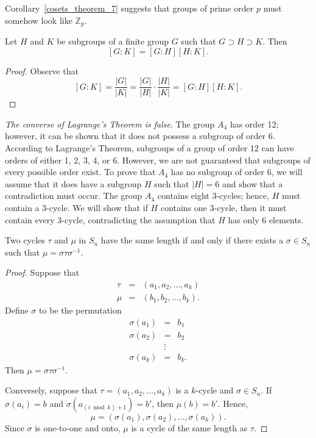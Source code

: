 \medskip

Corollary~\ref{cosets_theorem_7} suggests that groups of prime order $p$ must somehow look like ${\mathbb Z}_p$. 

\begin{corollary}\label{cosets_theorem_8}
Let $H$ and $K$ be subgroups of a finite group $G$ such that $G \supset H \supset K$.  Then 
$$
[G:K] = [G:H][H:K].
$$
\end{corollary}
 
\begin{proof}
Observe that
$$
[G:K] = \frac{|G|}{|K|} = \frac{|G|}{|H|} \cdot
\frac{|H|}{|K|} = [G:H][H:K].
$$
\end{proof}

\medskip
 
{\em The converse of Lagrange's Theorem is false}.  The group $A_4$ has order 12; however, it can be shown that it does not possess a subgroup of order 6.  According to Lagrange's Theorem, subgroups of a group of order 12 can have orders of either 1, 2, 3, 4, or  6.  However, we are not guaranteed that subgroups of every possible order exist.  To prove that $A_4$ has no subgroup of order 6, we will assume that it does have a subgroup $H$ such that $|H|=6$ and show that a contradiction must occur.  The group $A_4$ contains eight 3-cycles; hence, $H$ must contain a 3-cycle.  We will show that if $H$ contains one 3-cycle, then it must contain every 3-cycle, contradicting the assumption that $H$ has only 6 elements.

\begin{theorem}\label{cosets_theorem_9}
Two cycles $\tau$ and $\mu$ in $S_n$ have the same length if and only if there exists a $\sigma \in S_n$ such that $\mu = \sigma \tau \sigma^{-1}$.  
\end{theorem}
 
\begin{proof}
Suppose that
\begin{eqnarray*}
\tau & = & (a_1, a_2, \ldots, a_k ) \\
\mu  & = & (b_1, b_2, \ldots, b_k ).
\end{eqnarray*}
Define $\sigma$ to be the permutation
\begin{eqnarray*}
\sigma( a_1 ) & = & b_1 \\
\sigma( a_2 ) & = & b_2 \\
& \vdots &  \\
\sigma( a_k ) & = & b_k.
\end{eqnarray*}
Then $\mu = \sigma \tau \sigma^{-1}$.

Conversely, suppose that $\tau = (a_1, a_2, \ldots, a_k )$ is a $k$-cycle and $\sigma \in S_n$. If $\sigma( a_i ) = b$ and $\sigma( a_{(i \bmod k) + 1} ) = b'$, then $\mu( b) = b'$.  Hence, 
$$
\mu = ( \sigma(a_1), \sigma(a_2), \ldots, \sigma(a_k) ).
$$
Since $\sigma$ is one-to-one and onto, $\mu$ is a cycle of the same length as $\tau$. 
\end{proof}

